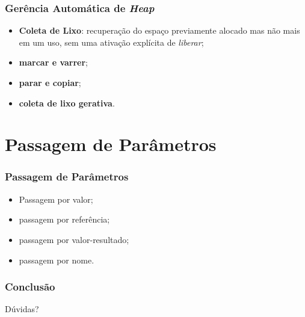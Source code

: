 \documentclass[table]{beamer}
\begin{document}
\begin{frame}
   \frametitle{Gerência Automática de \textit{Heap}}
   \begin{itemize}
      \item \textbf{Coleta de Lixo}: recuperação do espaço previamente alocado mas não mais em um uso, sem uma ativação explícita de \textit{liberar};
      \item \textbf{marcar e varrer};
      \item \textbf{parar e copiar};
      \item \textbf{coleta de lixo gerativa}.
   \end{itemize}
\end{frame}

\section{Passagem de Parâmetros}
\begin{frame}
   \frametitle{Passagem de Parâmetros}
   \begin{itemize}
      \item Passagem por valor;
      \item passagem por referência;
      \item passagem por valor-resultado;
      \item passagem por nome.
   \end{itemize}
\end{frame}

\begin{frame}
   \frametitle{Conclusão}
   Dúvidas?
\end{frame}
\end{document}
